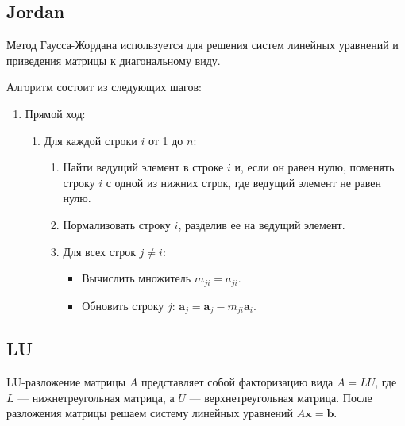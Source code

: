 \documentclass{article}
\begin{document}
\subsection{Jordan}

Метод Гаусса-Жордана используется для решения систем линейных уравнений и приведения матрицы к диагональному виду.

Алгоритм состоит из следующих шагов:
\begin{enumerate}
    \item Прямой ход:
    \begin{enumerate}
        \item Для каждой строки \(i\) от 1 до \(n\):
        \begin{enumerate}
            \item Найти ведущий элемент в строке \(i\) и, если он равен нулю, поменять строку \(i\) с одной из нижних строк, где ведущий элемент не равен нулю.
            \item Нормализовать строку \(i\), разделив ее на ведущий элемент.
            \item Для всех строк \(j \neq i\):
            \begin{itemize}
                \item Вычислить множитель \(m_{ji} = a_{ji}\).
                \item Обновить строку \(j\): \(\mathbf{a}_j = \mathbf{a}_j - m_{ji} \mathbf{a}_i\).
            \end{itemize}
        \end{enumerate}
    \end{enumerate}
\end{enumerate}
\subsection{LU}
LU-разложение матрицы \(A\) представляет собой факторизацию вида \(A = LU\), где \(L\) — нижнетреугольная матрица, а \(U\) — верхнетреугольная матрица. После разложения матрицы решаем систему линейных уравнений \(A\mathbf{x} = \mathbf{b}\).
\end{document}
